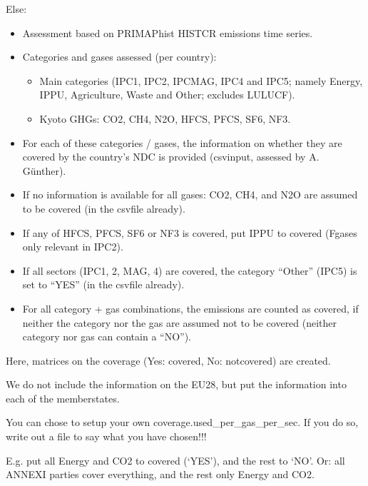 \documentclass[letterpaper,10pt,english]{sphinxmanual}
\begin{document}
Else:
\begin{itemize}
\item {} 
Assessment based on PRIMAP\sphinxhyphen{}hist HISTCR emissions time series.

\item {} 
Categories and gases assessed (per country):
\begin{itemize}
\item {} 
Main categories (IPC1, IPC2, IPCMAG, IPC4 and IPC5; namely Energy, IPPU, Agriculture, Waste and Other; excludes LULUCF).

\item {} 
Kyoto GHGs: CO2, CH4, N2O, HFCS, PFCS, SF6, NF3.

\end{itemize}

\item {} 
For each of these categories / gases, the information on whether they are covered by the country’s NDC is provided (csv\sphinxhyphen{}input, assessed by A. Günther).

\item {} 
If no information is available for all gases: CO2, CH4, and N2O are assumed to be covered (in the csv\sphinxhyphen{}file already).

\item {} 
If any of HFCS, PFCS, SF6 or NF3 is covered, put IPPU to covered (F\sphinxhyphen{}gases only relevant in IPC2).

\item {} 
If all sectors (IPC1, 2, MAG, 4) are covered, the category “Other” (IPC5) is set to “YES” (in the csv\sphinxhyphen{}file already).

\item {} 
For all category + gas combinations, the emissions are counted as covered, if neither the category nor the gas are assumed not to be covered (neither category nor gas can contain a “NO”).

\end{itemize}

Here, matrices on the coverage (Yes: covered, No: not\sphinxhyphen{}covered) are created.

We do not include the information on the EU28, but put the information into each of the member\sphinxhyphen{}states.

You can chose to setup your own coverage.used\_per\_gas\_per\_sec.
If you do so, write out a file to say what you have chosen!!!

E.g. put all Energy and CO2 to covered (‘YES’), and the rest to ‘NO’.
Or: all ANNEX\sphinxhyphen{}I parties cover everything, and the rest only Energy and CO2.
\end{document}
